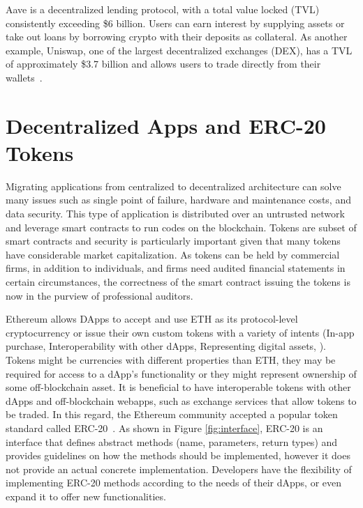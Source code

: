 \begin{example}
	Aave is a decentralized lending protocol, with a total value locked (TVL) consistently exceeding \$6 billion. Users can earn interest by supplying assets or take out loans by borrowing crypto with their deposits as collateral. As another example, Uniswap, one of the largest decentralized exchanges (DEX), has a TVL of approximately \$3.7 billion and allows users to trade directly from their wallets~\cite{theblock2024}.
\end{example}

\section{Decentralized Apps and ERC-20 Tokens}
Migrating applications from centralized to decentralized architecture can solve many issues such as single point of failure, hardware and maintenance costs, and data security. This type of application is distributed over an untrusted network and leverage smart contracts to run codes on the blockchain. Tokens are subset of smart contracts and security is particularly important given that many tokens have considerable market capitalization. As tokens can be held by commercial firms, in addition to individuals, and firms need audited financial statements in certain circumstances, the correctness of the smart contract issuing the tokens is now in the purview of professional auditors.

Ethereum allows DApps to accept and use ETH as its protocol-level cryptocurrency or issue their own custom tokens with a variety of intents (\eg In-app purchase, Interoperability with other dApps, Representing digital assets, \etc). Tokens might be currencies with different properties than ETH, they may be required for access to a dApp's functionality or they might represent ownership of some off-blockchain asset. It is beneficial to have interoperable tokens with other dApps and off-blockchain webapps, such as exchange services that allow tokens to be traded. In this regard, the Ethereum community accepted a popular token standard called ERC-20~\cite{Interface}. As shown in Figure \ref{fig:interface}, ERC-20 is an interface that defines abstract methods (name, parameters, return types) and provides guidelines on how the methods should be implemented, however it does not provide an actual concrete implementation. Developers have the flexibility of implementing ERC-20 methods according to the needs of their dApps, or even expand it to offer new functionalities.

